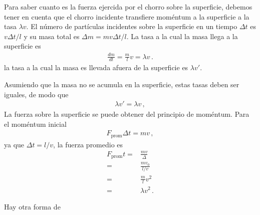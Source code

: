 \begin{borrar}
  
Para saber cuanto es la fuerza ejercida por el chorro
sobre la superficie, debemos tener en cuenta que el chorro incidente
transfiere moméntum a la superficie a la tasa $\lambda v$. El número
de partículas incidentes sobre la superficie en un tiempo $\Delta t$ es
$v\Delta t/l$ y su masa total es $\Delta m=m v\Delta t/l$. La tasa a
la cual la masa llega a la superficie es
\begin{align*}
  \frac{dm}{dt}=\frac{m}{l}v=\lambda v\,.
\end{align*}
la tasa a la cual la masa es llevada afuera de la superficie es
$\lambda v'$. 

Asumiendo que la masa no se acumula en la superficie, estas tasas
deben ser iguales, de modo que
\begin{align*}
  \lambda v'=\lambda v\,,
\end{align*}
La fuerza sobre la superficie se puede obtener del principio de moméntum. Para el moméntum inicial
\begin{align*}
  F_{\text{prom}}\Delta t =m v\,,
\end{align*}
ya que $\Delta t=l/v$, la fuerza promedio es
\begin{align*}
  F_{\text{prom}} t =&\frac{m v}{\Delta}\nonumber\\
=&\frac{m v_0}{l/v}\nonumber\\
=&\frac{m}{l} v^2\nonumber\\
=& \lambda v^2\,.
\end{align*}

Hay otra forma de 
\end{borrar}




